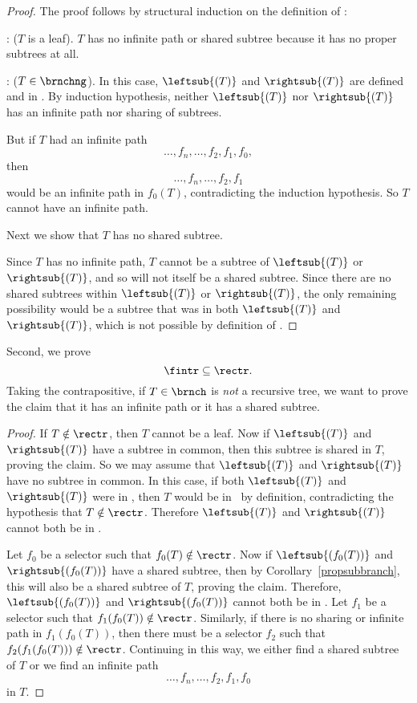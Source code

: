 \begin{definition}
\begin{proof}
The proof follows by structural induction on the
definition of \rectr:

: ($T$ is a leaf).  $T$ has no infinite path
or shared subtree because it has no proper subtrees at all.

: ($T \in \brnchng$).  In this case,
$\leftsub{(T)}$ and $\rightsub{(T)}$ are defined and in \rectr.  By
induction hypothesis, neither $\leftsub{(T)}$ nor $\rightsub{(T)}$ has an
infinite path nor sharing of subtrees.

But if $T$ had an infinite path
\[
\dots,f_n,\dots, f_2,f_1,f_0,
\]
then
\begin{equation}\label{dfnf2f1}
\dots,f_n,\dots,f_2,f_1
\end{equation}
would be an infinite path in $f_0(T)$, contradicting the induction
hypothesis.  So $T$ cannot have an infinite path.

Next we show that $T$ has no shared subtree.

Since $T$ has no infinite path, $T$ cannot be a subtree of
$\leftsub{(T)}$ or $\rightsub{(T)}$, and so will not itself be a
shared subtree.  Since there are no shared subtrees within
$\leftsub{(T)}$ or $\rightsub{(T)}$, the only remaining possibility
would be a subtree that was in both $\leftsub{(T)}$ and
$\rightsub{(T)}$, which is not possible by definition of \rectr.
\end{proof}

Second, we prove
\begin{equation}\label{fintrsubrectr}
\fintr \subseteq \rectr.
\end{equation}
Taking the contrapositive, if $T \in \brnch$ is \emph{not} a recursive
tree, we want to prove the claim that it has an infinite path or it
has a shared subtree.

\begin{proof}
If $T \notin \rectr$, then $T$ cannot be a leaf.  Now if
$\leftsub{(T)}$ and $\rightsub{(T)}$ have a subtree in common, then
this subtree is shared in $T$, proving the claim.  So we may assume
that $\leftsub{(T)}$ and $\rightsub{(T)}$ have no subtree in common.
In this case, if both $\leftsub{(T)}$ and $\rightsub{(T)}$ were in
\rectr, then $T$ would be in \rectr\ by definition, contradicting the
hypothesis that $T \notin \rectr$.  Therefore $\leftsub{(T)}$ and
$\rightsub{(T)}$ cannot both be in \rectr.

Let $f_0$ be a selector such that $f_0(T) \notin \rectr$.  Now if
$\leftsub{(f_0(T))}$ and $\rightsub{(f_0(T))}$ have a shared subtree,
then by Corollary~\ref{propsubbranch}, this will also be a shared
subtree of $T$, proving the claim.  Therefore, $\leftsub{(f_0(T))}$
and $\rightsub{(f_0(T))}$ cannot both be in \rectr.  Let $f_1$ be a
selector such that $f_1(f_0(T)) \notin \rectr$.  Similarly, if there
is no sharing or infinite path in $f_1(f_0(T))$, then there must be a
selector $f_2$ such that $f_2(f_1(f_0(T))) \notin \rectr$.  Continuing
in this way, we either find a shared subtree of $T$ or we find an
infinite path
\[
\dots,f_n,\dots, f_2,f_1,f_0
\]
in $T$.
\end{proof}


\end{definition}
